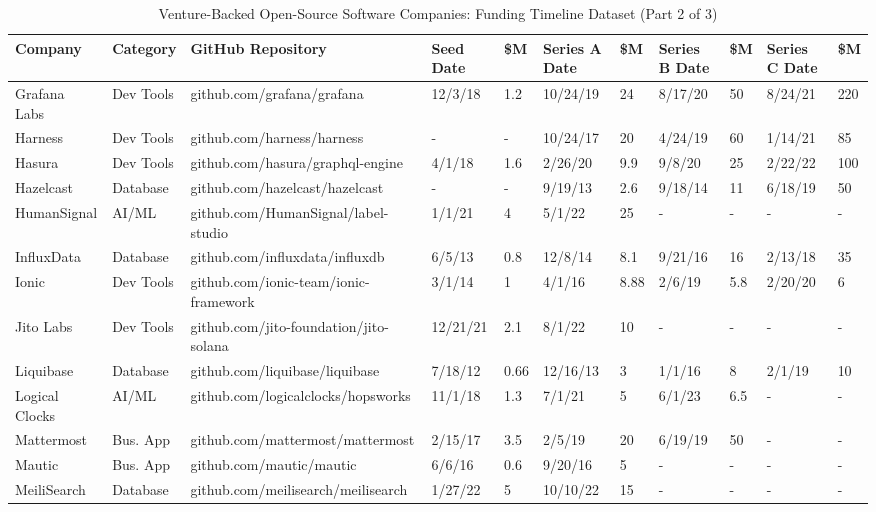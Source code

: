 \begin{landscape}
\begin{table}[htbp]
\centering
\scriptsize
\caption{Venture-Backed Open-Source Software Companies: Funding Timeline Dataset (Part 2 of 3)}
\label{tab:seed_data_2}
\begin{tabular}{|p{2.2cm}|p{1.6cm}|p{4cm}|p{1.1cm}|p{0.9cm}|p{1.1cm}|p{0.9cm}|p{1.1cm}|p{0.9cm}|p{1.1cm}|p{0.9cm}|}
\hline
\textbf{Company} & \textbf{Category} & \textbf{GitHub Repository} & \textbf{Seed Date} & \textbf{\$M} & \textbf{Series A Date} & \textbf{\$M} & \textbf{Series B Date} & \textbf{\$M} & \textbf{Series C Date} & \textbf{\$M} \\
\hline
Grafana Labs & Dev Tools & github.com/grafana/grafana & 12/3/18 & 1.2 & 10/24/19 & 24 & 8/17/20 & 50 & 8/24/21 & 220 \\
Harness & Dev Tools & github.com/harness/harness & - & - & 10/24/17 & 20 & 4/24/19 & 60 & 1/14/21 & 85 \\
Hasura & Dev Tools & github.com/hasura/graphql-engine & 4/1/18 & 1.6 & 2/26/20 & 9.9 & 9/8/20 & 25 & 2/22/22 & 100 \\
Hazelcast & Database & github.com/hazelcast/hazelcast & - & - & 9/19/13 & 2.6 & 9/18/14 & 11 & 6/18/19 & 50 \\
HumanSignal & AI/ML & github.com/HumanSignal/label-studio & 1/1/21 & 4 & 5/1/22 & 25 & - & - & - & - \\
InfluxData & Database & github.com/influxdata/influxdb & 6/5/13 & 0.8 & 12/8/14 & 8.1 & 9/21/16 & 16 & 2/13/18 & 35 \\
Ionic & Dev Tools & github.com/ionic-team/ionic-framework & 3/1/14 & 1 & 4/1/16 & 8.88 & 2/6/19 & 5.8 & 2/20/20 & 6 \\
Jito Labs & Dev Tools & github.com/jito-foundation/jito-solana & 12/21/21 & 2.1 & 8/1/22 & 10 & - & - & - & - \\
Liquibase & Database & github.com/liquibase/liquibase & 7/18/12 & 0.66 & 12/16/13 & 3 & 1/1/16 & 8 & 2/1/19 & 10 \\
Logical Clocks & AI/ML & github.com/logicalclocks/hopsworks & 11/1/18 & 1.3 & 7/1/21 & 5 & 6/1/23 & 6.5 & - & - \\
Mattermost & Bus. App & github.com/mattermost/mattermost & 2/15/17 & 3.5 & 2/5/19 & 20 & 6/19/19 & 50 & - & - \\
Mautic & Bus. App & github.com/mautic/mautic & 6/6/16 & 0.6 & 9/20/16 & 5 & - & - & - & - \\
MeiliSearch & Database & github.com/meilisearch/meilisearch & 1/27/22 & 5 & 10/10/22 & 15 & - & - & - & - \\

\end{tabular}
\end{table}
\end{landscape}
